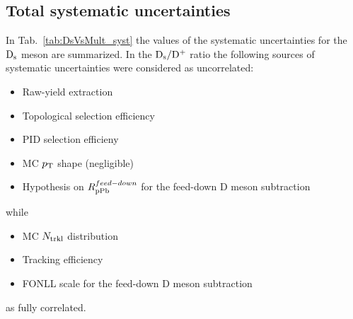 \subsection{Total systematic uncertainties}
\label{sec:Ratiosyst}
In Tab.~\ref{tab:DsVsMult_syst} the values of the systematic 
uncertainties for the ${\rm D_s}$ meson are summarized.
In the ${\rm D_s}/{\rm D^+}$ ratio the following sources of systematic uncertainties were considered as uncorrelated:
\begin{itemize}
\item Raw-yield extraction
\item Topological selection efficiency
\item PID selection efficieny
\item MC $p_{\rm T}$ shape (negligible)
\item Hypothesis on $R_{\rm pPb}^{feed-down}$ for the feed-down D meson subtraction
\end{itemize} 
while
\begin{itemize}
\item MC $N_{\rm trkl}$ distribution
\item Tracking efficiency
\item FONLL scale for the feed-down D meson subtraction
\end{itemize} 
as fully correlated.


